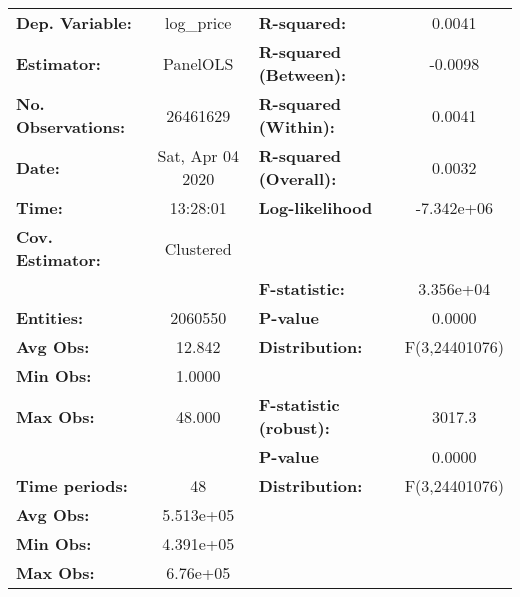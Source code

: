 \documentclass{report}
\begin{document}
\begin{center}
\begin{tabular}{lclc}
\toprule
\textbf{Dep. Variable:}      &     log\_price     & \textbf{  R-squared:         }   &      0.0041      \\
\textbf{Estimator:}          &      PanelOLS      & \textbf{  R-squared (Between):}  &     -0.0098      \\
\textbf{No. Observations:}   &      26461629      & \textbf{  R-squared (Within):}   &      0.0041      \\
\textbf{Date:}               &  Sat, Apr 04 2020  & \textbf{  R-squared (Overall):}  &      0.0032      \\
\textbf{Time:}               &      13:28:01      & \textbf{  Log-likelihood     }   &    -7.342e+06    \\
\textbf{Cov. Estimator:}     &     Clustered      & \textbf{                     }   &                  \\
\textbf{}                    &                    & \textbf{  F-statistic:       }   &    3.356e+04     \\
\textbf{Entities:}           &      2060550       & \textbf{  P-value            }   &      0.0000      \\
\textbf{Avg Obs:}            &       12.842       & \textbf{  Distribution:      }   &  F(3,24401076)   \\
\textbf{Min Obs:}            &       1.0000       & \textbf{                     }   &                  \\
\textbf{Max Obs:}            &       48.000       & \textbf{  F-statistic (robust):} &      3017.3      \\
\textbf{}                    &                    & \textbf{  P-value            }   &      0.0000      \\
\textbf{Time periods:}       &         48         & \textbf{  Distribution:      }   &  F(3,24401076)   \\
\textbf{Avg Obs:}            &     5.513e+05      & \textbf{                     }   &                  \\
\textbf{Min Obs:}            &     4.391e+05      & \textbf{                     }   &                  \\
\textbf{Max Obs:}            &      6.76e+05      & \textbf{                     }   &                  \\
\bottomrule
\end{tabular}
\begin{tabular}{lcccccc}

\end{tabular}
\end{center}
\end{document}
